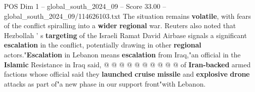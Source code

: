 \begin{textsample}{POS Dim 1 – global\_south\_2024\_09 – Score 33.00 – global\_south\_2024\_09/114626103.txt}
The situation remains \textbf{volatile}, with fears of the conflict spiralling into a \textbf{wider} \textbf{regional} war.
Reuters also noted that Hezbollah ' s \textbf{targeting} of the Israeli Ramat David Airbase signals a significant \textbf{escalation} in the conflict, potentially drawing in other \textbf{regional} actors."\textbf{Escalation} in Lebanon means \textbf{escalation} from Iraq,"an official in the \textbf{Islamic} Resistance in Iraq said, @ @ @ @ @ @ @ @ @ @ of \textbf{Iran-backed} armed factions whose official said they \textbf{launched} \textbf{cruise} \textbf{missile} and \textbf{explosive} \textbf{drone} attacks as part of"a new phase in our support front"with Lebanon.

\end{textsample}
